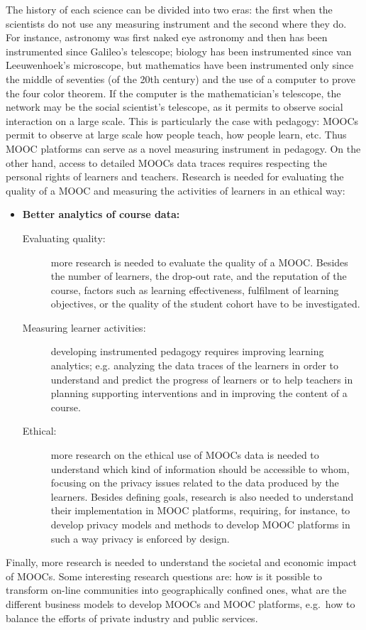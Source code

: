  The history of each science can be divided into two eras: the first when the scientists do not use any measuring instrument and the second where they do. For instance, astronomy was first naked eye astronomy and then has been instrumented since Galileo's telescope; biology has been instrumented since van Leeuwenhoek's microscope, but mathematics have been instrumented only since the middle of seventies (of the 20th century) and the use of a computer to prove the four color theorem. If the computer is the mathematician's telescope, the network may be the social scientist's telescope, as it permits to observe  social interaction on a large scale. This is particularly the case with pedagogy: MOOCs permit to observe at large scale how people teach, how people learn, etc. Thus MOOC platforms can serve as a novel measuring instrument in pedagogy. On the other hand, access to detailed MOOCs data traces requires respecting the personal rights of learners and teachers.  Research is needed for evaluating the quality of a MOOC and measuring the activities of learners in an ethical way:

\begin{itemize}
\item \textbf{Better analytics of course data:}
\begin{description}
\item[Evaluating quality:] more research is needed to evaluate the quality of a MOOC. Besides the number of learners, the drop-out rate, and the reputation of the course, factors such as learning effectiveness, fulfilment of learning objectives, or the  quality of the student cohort have to be investigated.
\item[Measuring learner activities:] developing instrumented pedagogy requires improving  learning analytics; e.g. analyzing the data traces of the learners in order to understand and predict the  progress of learners or to help teachers in planning supporting interventions and in improving the content of a course.
\item[Ethical:] more research on the ethical use of MOOCs data is needed to understand which kind of information should be accessible to whom, focusing on the privacy issues related to the data produced by the learners. Besides defining goals, research is also needed to understand their implementation in MOOC platforms, requiring, for instance, to develop privacy models and methods to develop MOOC platforms in such a way privacy is enforced by design.
\end{description}
\end{itemize}

Finally, more research is needed to understand the societal and economic impact of MOOCs. Some interesting research questions are:  how is it possible to transform on-line communities into geographically confined ones, what are the different business models to develop MOOCs and MOOC platforms, e.g.\ how to balance the efforts of private industry and public services.

